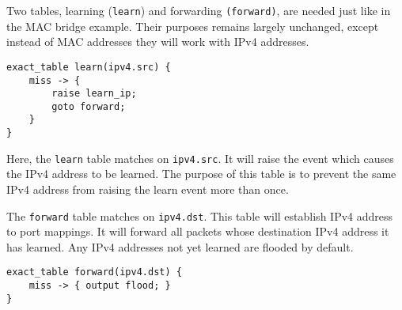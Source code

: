 %
%
%
%
%


Two tables, learning (\texttt{learn}) and forwarding \texttt{(forward)},
are needed just like in the MAC bridge example. Their purposes
remains largely unchanged, except instead of MAC addresses they
will work with IPv4 addresses.

\begin{lstlisting}
exact_table learn(ipv4.src) {
	miss -> {
		raise learn_ip;
		goto forward;
	}
}
\end{lstlisting}

Here, the \texttt{learn} table matches on \texttt{ipv4.src}. 
It will raise the event which causes the IPv4 address to be learned. 
The purpose of this table is to prevent the same IPv4 address from
raising the learn event more than once.

The \texttt{forward} table matches on \texttt{ipv4.dst}. This table will establish IPv4
address to port mappings. It will forward all packets whose destination IPv4
address it has learned. Any IPv4 addresses not yet learned are flooded by
default.

\begin{lstlisting}
exact_table forward(ipv4.dst) {
	miss -> { output flood; }
}
\end{lstlisting}

